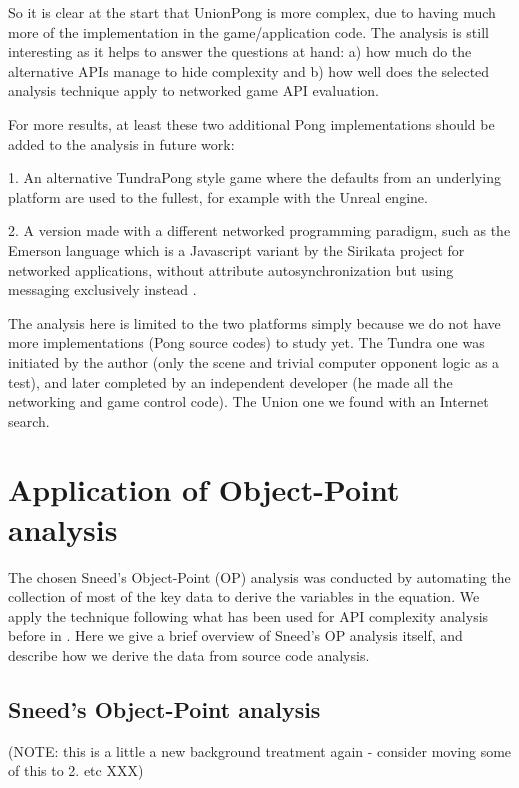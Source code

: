 \documentclass[conference]{IEEEtran}
\begin{document}
So it is clear at the start that UnionPong is more complex, due to
having much more of the implementation in the game/application
code. The analysis is still interesting as it helps to answer the
questions at hand: a) how much do the alternative APIs manage to hide
complexity and b) how well does the selected analysis technique apply
to networked game API evaluation.

For more results, at least these two additional Pong implementations
should be added to the analysis in future work:

1. An alternative TundraPong style game where the defaults from an
underlying platform are used to the fullest, for example with the
Unreal engine.

2. A version made with a different networked programming paradigm,
such as the Emerson language which is a Javascript variant by the
Sirikata project for networked applications, without attribute
autosynchronization but using messaging exclusively instead
\cite{sirikata-scripting}.

The analysis here is limited to the two platforms simply because we do
not have more implementations (Pong source codes) to study yet. The
Tundra one was initiated by the author (only the scene and trivial
computer opponent logic as a test), and later completed by an
independent developer (he made all the networking and game control
code). The Union one we found with an Internet search.


\section{Application of Object-Point analysis%
  \label{application-of-object-point-analysis}%
}

The chosen Sneed's Object-Point (OP) analysis was conducted by
automating the collection of most of the key data to derive the
variables in the equation. We apply the technique following what has
been used for API complexity analysis before in
\cite{api-complexity-analysis}. Here we give a brief overview of Sneed's
OP analysis itself, and describe how we derive the data from source
code analysis.


\subsection{Sneed's Object-Point analysis%
  \label{sneed-s-object-point-analysis}%
}

(NOTE: this is a little a new background treatment again - consider
moving some of this to 2. etc XXX)
\end{document}
